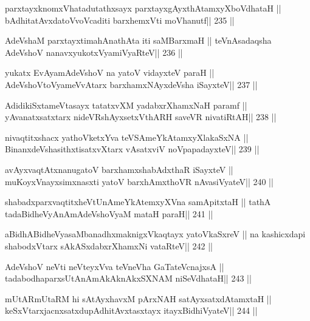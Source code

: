 \begin{shl}
parxtayxknomxVhatadutathxsayx parxtayxgAyxthAtamxyXboVdhataH ||
bAdhitatAvxdatoV\s voVcaditi barxhemxVti moVhanutf\hfill || 235 ||
\end{shl}

\begin{shl}
AdeVshaM parxtayxtimahAnathAta iti saMBarxmaH ||
teVnAsadaqsha AdeVshoV nanavxyukotxV\s yamiVyaRteV\hfill || 236 ||
\end{shl}

\begin{shl}
yukatx EvAyamAdeVshoV na yatoV vidayxteV paraH ||
AdeVshoV\s toV\s yameVvAtarx barxhamxNAyxdeVsha iSayxteV\hfill || 237 ||
\end{shl}

\begin{shl}
AdidikiSxtameVtasayx tatatxvXM yadabxrXhamxNaH paramf ||
yAvanatxsatxtarx nideVRshAyxsetxV\s thARH saveVR nivatiRtAH\hfill || 238 ||
\end{shl}

\begin{shl}
nivaqtitxshacx yathoVketxYva teVSAmeYkAtamxyXlakaSxNA ||
BinanxdeVshasithxtisatxvXtarx vAsatxviV noVpapadayxteV\hfill || 239 ||
\end{shl}

\begin{shl}
avAyxvaqtAtxnanugatoV barxhamxshabAdxthaR iSayxteV ||
muKoyxV\s nayxsimxnasxti yatoV barxhAmxthoVR nAvasiVyateV\hfill || 240 ||
\end{shl}

\begin{shl}
shabadxparxvaqtitxheVtUnAmeYkAtemxyXVna samApitxtaH ||
tathA tadaBidheVyAnAmAdeVshoV\s yaM mataH paraH\hfill || 241 ||
\end{shl}

\begin{shl}
aBidhABidheVyasaMbanadhxmaknigxVkaqtayx yatoV\s kaSxreV ||
na kashicxdapi shabodxV\s tarx sAkASxdabxrXhamxNi vataRteV\hfill || 242 ||
\end{shl}

\begin{shl}
AdeVshoV neVti neVteyxVva teVneVha GaTateV\s cnajxsA ||
tadabodhaparxsUtAnAmAkAknAkxSXNAM niSeVdhataH\hfill || 243 ||
\end{shl}

\begin{shl}
mUtARmUtaRM hi sAtAyxhavxM pArxNAH satAyxsatxdAtamxtaH ||
keSxVtarxjacnxsatxdupAdhitAvxtasxtayx itayxBidhiVyateV\hfill || 244 ||
\end{shl}

